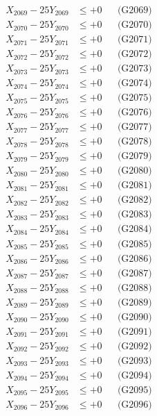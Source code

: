 \documentclass[a4paper,10pt]{article}
\begin{document}
{\begin{align}
X_{2069} - 25Y_{2069} &\leq +0 && \text{(G2069)} \\
X_{2070} - 25Y_{2070} &\leq +0 && \text{(G2070)} \\
\allowbreak
X_{2071} - 25Y_{2071} &\leq +0 && \text{(G2071)} \\
X_{2072} - 25Y_{2072} &\leq +0 && \text{(G2072)} \\
X_{2073} - 25Y_{2073} &\leq +0 && \text{(G2073)} \\
X_{2074} - 25Y_{2074} &\leq +0 && \text{(G2074)} \\
X_{2075} - 25Y_{2075} &\leq +0 && \text{(G2075)} \\
X_{2076} - 25Y_{2076} &\leq +0 && \text{(G2076)} \\
X_{2077} - 25Y_{2077} &\leq +0 && \text{(G2077)} \\
X_{2078} - 25Y_{2078} &\leq +0 && \text{(G2078)} \\
X_{2079} - 25Y_{2079} &\leq +0 && \text{(G2079)} \\
X_{2080} - 25Y_{2080} &\leq +0 && \text{(G2080)} \\
\allowbreak
X_{2081} - 25Y_{2081} &\leq +0 && \text{(G2081)} \\
X_{2082} - 25Y_{2082} &\leq +0 && \text{(G2082)} \\
X_{2083} - 25Y_{2083} &\leq +0 && \text{(G2083)} \\
X_{2084} - 25Y_{2084} &\leq +0 && \text{(G2084)} \\
X_{2085} - 25Y_{2085} &\leq +0 && \text{(G2085)} \\
X_{2086} - 25Y_{2086} &\leq +0 && \text{(G2086)} \\
X_{2087} - 25Y_{2087} &\leq +0 && \text{(G2087)} \\
X_{2088} - 25Y_{2088} &\leq +0 && \text{(G2088)} \\
X_{2089} - 25Y_{2089} &\leq +0 && \text{(G2089)} \\
X_{2090} - 25Y_{2090} &\leq +0 && \text{(G2090)} \\
\allowbreak
X_{2091} - 25Y_{2091} &\leq +0 && \text{(G2091)} \\
X_{2092} - 25Y_{2092} &\leq +0 && \text{(G2092)} \\
X_{2093} - 25Y_{2093} &\leq +0 && \text{(G2093)} \\
X_{2094} - 25Y_{2094} &\leq +0 && \text{(G2094)} \\
X_{2095} - 25Y_{2095} &\leq +0 && \text{(G2095)} \\
X_{2096} - 25Y_{2096} &\leq +0 && \text{(G2096)} \\

\end{align}}
\end{document}
